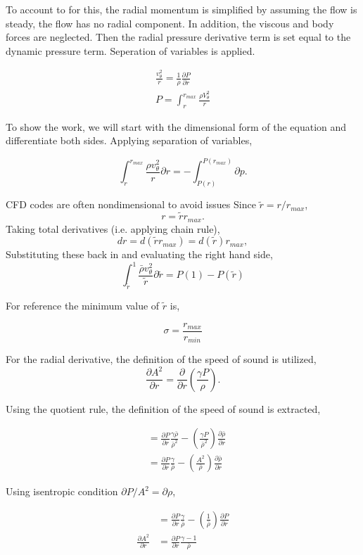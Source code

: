  To account to for this, the radial momentum is simplified by assuming the 
 flow is steady, the flow has no radial component. In addition, the viscous
 and body forces are neglected.  Then the radial pressure derivative term is
 set equal to the dynamic pressure term. Seperation of variables is applied.  

 \begin{align*}
     \frac{v_{\theta}^2}{r} = \frac{1}{\rho}\frac{\partial P}{\partial r} \\
 P = \int_{r}^{r_{max}} \frac{\rho V_{\theta}^2}{  r}
 \end{align*}

To show the work, we will start with the dimensional form of the equation and
differentiate both sides.  Applying separation of variables,


$$     \int_{r}^{r_{max}}
     \frac{{\rho} v_{\theta}^2}{r} \partial r 
     =-\int_{P(r)}^{P(r_{max})}\partial p.
$$

CFD codes are often nondimensional to avoid issues 
Since $\tilde{r} = r/r_{max}$,
$$r = \tilde{r}r_{max}.$$
Taking total derivatives (i.e. applying chain rule),
$$dr = d(\tilde{r}r_{max}) = d(\tilde{r})r_{max}, $$
Substituting these back in and evaluating the right hand side,
$$
    \int_{\tilde{r}}^{1} \frac{\bar{\rho} v_{\theta}^2}{\tilde{r}}\partial \tilde{r} 
    =P(1)-P(\tilde{r})
$$

For reference the minimum value of $\tilde{r}$ is,

$$\sigma = \frac{r_{max}}{r_{min}}$$

For the radial derivative, the definition of the speed of sound is utilized,
$$\frac{\partial A^2}{\partial r } =
\frac{\partial}{\partial r} \left( \frac{\gamma P}{\rho} \right).$$

Using the quotient rule, the definition of the speed of sound is extracted,

\begin{align*}
&= \frac{\partial P}{\partial r} \frac{\gamma \bar{\rho}}{\bar{\rho}^2} -
\left(
    \frac{\gamma P}{\bar{\rho}^2} 
\right) 
\frac{\partial \bar{\rho}}{\partial r}\\
&=  \frac{\partial P}{\partial r} \frac{\gamma }{\bar{\rho}} -
\left( \frac{A^2}{\bar{\rho}} \right) 
\frac{\partial \bar{\rho} }{\partial r}
\end{align*}

Using isentropic condition $ \partial P/A^2 = \partial \rho$, 

\begin{align*}
&= \frac{\partial P}{\partial r} \frac{\gamma }{\bar{\rho}} -
\left( \frac{1}{\bar{\rho}} \right) \frac{\partial  P }{\partial r}\\
\frac{\partial A^2}{\partial r} 
&= \frac{\partial P}{\partial r} \frac{\gamma - 1}{\bar{\rho}}  
\end{align*}

